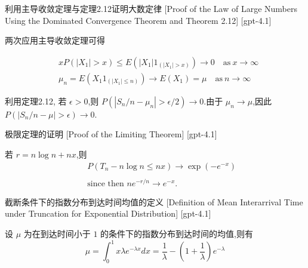 \documentclass[UTF8]{ctexart}
\begin{document}
    
    
    \begin{prf}
        {利用主导收敛定理与定理2.12证明大数定律}
        [Proof of the Law of Large Numbers Using the Dominated Convergence Theorem and Theorem 2.12]
        [gpt-4.1]
        
两次应用主导收敛定理可得

\[
\begin{array}{rl}
& x P(|X_{1}| > x) \leq E(|X_{1}| 1_{(|X_{1}| > x)}) \to 0 \quad \mathrm{as~} x \to \infty \\
& \mu_{n} = E(X_{1} 1_{(|X_{1}| \leq n)}) \to E(X_{1}) = \mu \quad \mathrm{as~} n \to \infty
\end{array}
\]

利用定理2.12, 若 $\epsilon > 0$,则 $P(|S_{n}/n - \mu_{n}| > \epsilon/2) \to 0$.由于 $\mu_{n} \to \mu$,因此 $P(|S_{n}/n - \mu| > \epsilon) \to 0$.

    \end{prf}
    
    
    
    \begin{prf}
        {极限定理的证明}
        [Proof of the Limiting Theorem]
        [gpt-4.1]
        
若 $r = n \log n + n x$,则
\[
\begin{array}{rcl}
&& P(T_n - n \log n \leq n x) \to \exp(- e^{-x}) \\
&& \\
&& \text{since then } n e^{- r / n} \to e^{-x}.
\end{array}
\]

    \end{prf}
    
    
    
    \begin{dfn}
        {截断条件下的指数分布到达时间均值的定义}
        [Definition of Mean Interarrival Time under Truncation for Exponential Distribution]
        [gpt-4.1]
        
设 $\mu$ 为在到达时间小于 $1$ 的条件下的指数分布到达时间的均值,则有
\[
\mu = \int _ { 0 } ^ { 1 } x \lambda e ^ { - \lambda x } d x = \frac { 1 } { \lambda } - \left( 1 + \frac { 1 } { \lambda } \right) e ^ { - \lambda }
\]

    \end{dfn}
    
\end{document}
